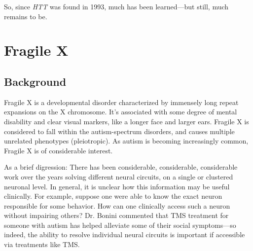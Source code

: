So, since \textit{HTT} was found in 1993, much has been learned---but still, much remains to be. 


\section{Fragile X}

\subsection*{Background}

Fragile X is a developmental disorder characterized by immensely long repeat expansions on the X chromosome. It's associated with some degree of mental disability and clear visual markers, like a longer face and larger ears. Fragile X is considered to fall within the autism-spectrum disorders, and causes multiple unrelated phenotypes (pleiotropic). As autism is becoming increasingly common, Fragile X is of considerable interest.\newline

As a brief digression: There has been considerable, considerable, considerable work over the years solving different neural circuits, on a single or clustered neuronal level. In general, it is unclear how this information may be useful clinically. For example, suppose one were able to know the exact neuron responsible for some behavior. How can one clinically access such a neuron without impairing others? Dr. Bonini commented that TMS treatment for someone with autism has helped alleviate some of their social symptoms---so indeed, the ability to resolve individual neural circuits is important if accessible via treatments like TMS.\newline

